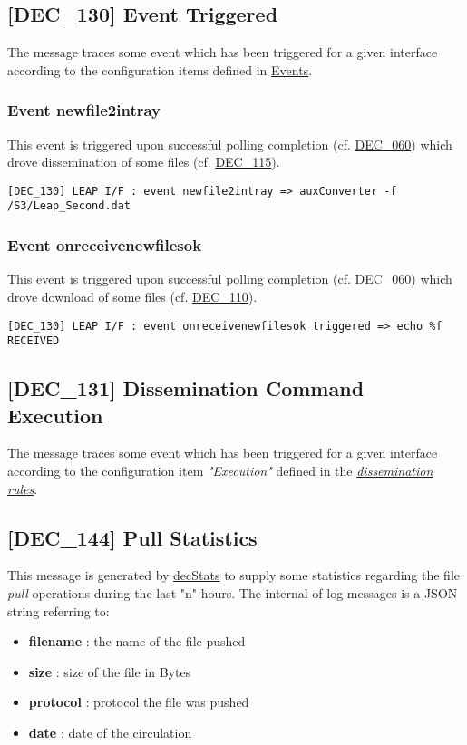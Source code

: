 \documentclass[dec_sum_main.tex]{subfiles}
\begin{document}
\subsection{[DEC\_130] Event Triggered}
The message traces some event which has been triggered for a given interface according to the configuration items defined in \hyperref[Events]{Events}.

\subsubsection{Event newfile2intray}
This event is triggered upon successful polling completion (cf. \hyperref[DEC060]{DEC\_060}) which drove dissemination of some files (cf. \hyperref[DEC115]{DEC\_115}).
\begin{verbatim}
[DEC_130] LEAP I/F : event newfile2intray => auxConverter -f /S3/Leap_Second.dat
\end{verbatim}

\subsubsection{Event onreceivenewfilesok}
This event is triggered upon successful polling completion (cf. \hyperref[DEC060]{DEC\_060}) which drove download of some files (cf. \hyperref[DEC110]{DEC\_110}).
\begin{verbatim}
[DEC_130] LEAP I/F : event onreceivenewfilesok triggered => echo %f RECEIVED
\end{verbatim}

\subsection{[DEC\_131] Dissemination Command Execution }
The message traces some event which has been triggered for a given interface according to the configuration item \textit{"Execution"} defined in the \hyperref[Dissemination rules]{\textit{dissemination rules}}.

\label{DEC144}
\subsection{[DEC\_144] Pull Statistics}
This message is generated by \hyperref[decStats]{decStats} to supply some statistics regarding the file \textit{pull} operations during the last "n" hours.\newline
The internal of log messages is a JSON string referring to:
\begin{itemize}
	\item \textbf{filename} : the name of the file pushed
	\item \textbf{size} : size of the file in Bytes
	\item \textbf{protocol} : protocol the file was pushed
	\item \textbf{date} : date of the circulation
\end{itemize}
\end{document}
